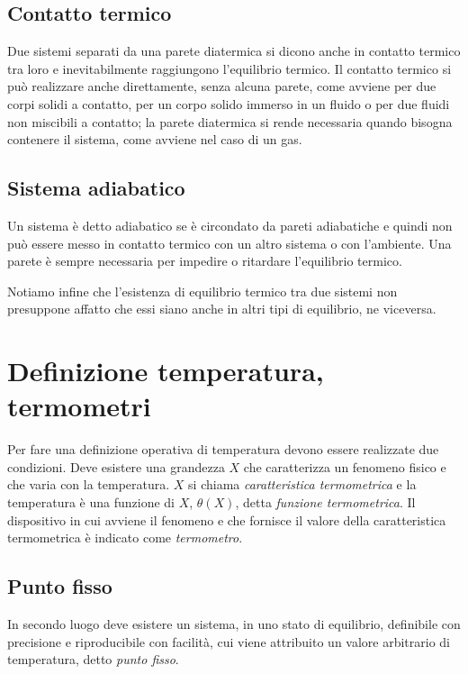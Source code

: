 \documentclass[class=book, crop=false, oneside, 12pt]{standalone}
\begin{document}
\subsection{Contatto termico}

Due sistemi separati da una parete diatermica si dicono anche in contatto termico tra loro e inevitabilmente raggiungono l'equilibrio termico. 
Il contatto termico si può realizzare anche direttamente, senza alcuna parete, come avviene per due corpi solidi a contatto, per un corpo solido immerso in un fluido o per due fluidi non miscibili a contatto; la parete diatermica si rende necessaria quando bisogna contenere il sistema, come avviene nel caso di un gas. 

\subsection{Sistema adiabatico}

Un sistema è detto adiabatico se è circondato da pareti adiabatiche e quindi non può essere messo in contatto termico con un altro sistema o  con l'ambiente. 
Una parete è sempre necessaria per impedire o ritardare l'equilibrio termico. 

Notiamo infine che l'esistenza di equilibrio termico tra due sistemi non presuppone affatto che essi siano anche in altri tipi di equilibrio, ne viceversa.

\section{Definizione temperatura, termometri}

Per fare una definizione operativa di temperatura devono essere realizzate due condizioni. 
Deve esistere una grandezza \(X\) che caratterizza un fenomeno fisico e che varia con la temperatura. 
\(X\) si chiama \emph{caratteristica termometrica} e la temperatura è una funzione di \(X\), \(\theta (X)\), detta \emph{funzione termometrica}. 
Il dispositivo in cui avviene il fenomeno e che fornisce il valore della caratteristica termometrica è indicato come \emph{termometro}.

\subsection{Punto fisso}

In secondo luogo deve esistere un sistema, in uno stato di equilibrio, definibile con precisione e riproducibile con facilità, cui viene attribuito un valore arbitrario di temperatura, detto \emph{punto fisso}.
\end{document}
